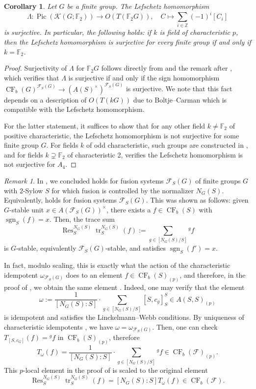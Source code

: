 \documentclass[]{amsart}
\newcommand{\Res}{\operatorname{Res}}
\newcommand{\Pic}{\operatorname{Pic}}
\newcommand{\on}[1]{\operatorname{#1}}
\newcommand{\calF}{\mathcal{F}}
\newcommand{\catK}{\mathscr{K}}
\newcommand{\bbF}{\mathbb{F}}
\newcommand{\bbZ}{\mathbb{Z}}
\newcommand{\CF}{\on{CF}}
\newcommand{\sgn}{\on{sgn}}
\newtheorem{corollary}[theorem]{Corollary}
\theoremstyle{remark}
\newtheorem{remark}[theorem]{Remark}
\theoremstyle{definition}
\begin{document}
	\begin{corollary}\label{cor:thmB}
		Let $G$ be a finite group. The Lefschetz homomorphism \[\Lambda\colon \Pic(\catK(G;\bbF_2)) \to O(T(\bbF_2G)), \quad C \mapsto \sum_{i \in \bbZ} (-1)^i[C_i]\] is surjective. In particular, the following holds: if $k$ is field of characteristic $p$, then the Lefschetz homomorphism is surjective for every finite group if and only if $k = \bbF_2$.
	\end{corollary}
	\begin{proof}
		Surjectivity of $\Lambda$ for $\bbF_2 G$ follows directly from  and the remark after \cite[Theorem 4.1]{MM26}, which verifies that $\Lambda$ is surjective if and only if the sign homomorphism $\CF_b(G)^{\calF_S(G)} \to (A(S)^\times)^{\calF_S(G)}$ is surjective. We note that this fact depends on a description of $O(T(kG))$ due to Boltje--Carman \cite{BC23} which is compatible with the Lefschetz homomorphism.
		
		For the latter statement, it suffices to show that for any other field $k\neq \bbF_2$ of positive characteristic, the Lefschetz homomorphism is not surjective for some finite group $G$. For fields $k$ of odd characteristic, such groups are constructed in \cite[Theorem 5.10]{MM26}, and for fields $k \supsetneq \bbF_2$ of characteristic 2, \cite[Example 7.7]{M24a} verifies the Lefschetz homomorphism is not surjective for $A_4$. 
	\end{proof}
	
	\begin{remark}
		In \cite[Theorem 4.5]{MM26}, we concluded  holds for fusion systems $\calF_S(G)$ of finite groups $G$ with $2$-Sylow $S$ for which fusion is controlled by the normalizer $N_G(S)$. Equivalently,  holds for fusion systems $\calF_S(G)$. This was shown as follows: given $G$-stable unit $x \in A(\calF_S(G))^\times$, there exists a $f \in \CF_b(S)$ with $\sgn_S(f) = x$. Then, the trace sum \[\Res^{N_G(S)}_S\on{tr}^{N_G(S)}_{S} (f) := \sum_{g \in [N_G(S)/S]}{}^g f\] is $G$-stable, equivalently $\calF_S(G)$-stable, and satisfies $\sgn_S(f') = x$. 
		
		In fact, modulo scaling, this is exactly what the action of the characteristic idempotent $\omega_{\calF_S(G)}$ does to an element $f \in \CF_b(S)_{(p)}$, and therefore, in the proof of , we obtain the same element . Indeed, one may verify that the element \[\omega := \frac{1}{[N_G(S):S]}\cdot \sum_{g\in [N_G(S)/S]} [S, c_g]^S_S \in A(S,S)_{(p)}\] is idempotent and satisfies the Linckelmann--Webb conditions. By uniqueness of characteristic idempotents \cite[Theorem C]{RS13}, we have $\omega = \omega_{\calF_S(G)}$. Then, one can check $T_{[S, c_G]}(f) = {}^gf$ in $\CF_b(S)_{(p)}$, therefore \[T_\omega (f) = \frac{1}{[N_G(S):S]} \cdot \sum_{g\in [N_G(S)/S]} {}^gf \in \on{CF}_b(\calF)_{(p)}.\] This $p$-local element in the proof of  is scaled to the original element \[\Res^{N_G(S)}_S \on{tr}^{N_G(S)}_S(f)= [N_G(S):S]T_\omega(f) \in \CF_b(\calF).\]
	\end{remark}
	
	
	
	
\end{document}

